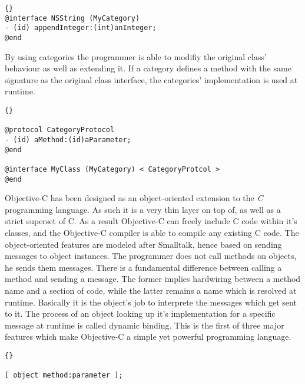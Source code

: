 \lstset{language=[Objective]C}
\begin{lstlisting}[captionpos=b, caption=An Objective-C category added to the
NSString class., label=lst_objccategory]{}
@interface NSString (MyCategory)
- (id) appendInteger:(int)anInteger;
@end
\end{lstlisting}

By using categories the programmer is able to modifiy the original class'
behaviour as well as extending it. If a category defines a method with the same
signature as the original class interface, the categories' implementation is
used at runtime.

\begin{lstlisting}[captionpos=b, caption=Attaching a protocol to an existing
class by the means of a category., label=lst_objccategoryprotocol]{}

@protocol CategoryProtocol
- (id) aMethod:(id)aParameter;
@end

@interface MyClass (MyCategory) < CategoryProtcol >
@end

\end{lstlisting}




Objective-C has been designed as an object-oriented extension to the
\textit{C} programming language. As such it is a very thin layer on top of, as
well as a strict superset of C. As a result Objective-C can freely include C
code within it's classes, and the Objective-C compiler is able to compile any
existing C code. The object-oriented features are modeled after Smalltalk, hence
based on sending messages to object instances. The programmer does not call
methods on objects, he sends them messages. There is a fundamental difference
between calling a method and sending a message. The former implies hardwiring
between a method name and a section of code, while the latter remains a name
which is resolved at runtime. Basically it is the object's job to interprete
the messages which get sent to it. The process of an object looking up it's
implementation for a specific message at runtime is called dynamic binding. This
is the first of three major features which make Objective-C a simple yet
powerful programming language.

\lstset{language=[Objective]C}
\begin{lstlisting}[captionpos=b, caption=An Objective-C message send,
label=lst_objcmsgsend]{}

[ object method:parameter ];

\end{lstlisting}


